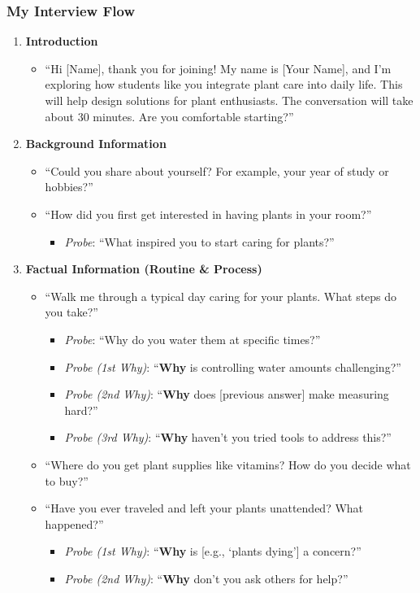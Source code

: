 \documentclass[math,code]{amznotes}
\theoremstyle{remark}
\begin{document}
\subsubsection{My Interview Flow}
\begin{enumerate}
    \item \textbf{Introduction}
    \begin{itemize}
        \item ``Hi [Name], thank you for joining! My name is [Your Name], and I’m exploring how students like you integrate plant care into daily life. This will help design solutions for plant enthusiasts. The conversation will take about 30 minutes. Are you comfortable starting?''
    \end{itemize}
    
    \item \textbf{Background Information}
    \begin{itemize}
        \item ``Could you share about yourself? For example, your year of study or hobbies?''
        \item ``How did you first get interested in having plants in your room?''
        \begin{itemize}
            \item \textit{Probe}: ``What inspired you to start caring for plants?''
        \end{itemize}
    \end{itemize}
    
    \item \textbf{Factual Information (Routine \& Process)}
    \begin{itemize}
        \item ``Walk me through a typical day caring for your plants. What steps do you take?''
        \begin{itemize}
            \item \textit{Probe}: ``Why do you water them at specific times?''
            \item \textit{Probe (1st Why)}: ``\textbf{Why} is controlling water amounts challenging?''
            \item \textit{Probe (2nd Why)}: ``\textbf{Why} does [previous answer] make measuring hard?''
            \item \textit{Probe (3rd Why)}: ``\textbf{Why} haven’t you tried tools to address this?''
        \end{itemize}
        \item ``Where do you get plant supplies like vitamins? How do you decide what to buy?''
        \item ``Have you ever traveled and left your plants unattended? What happened?''
        \begin{itemize}
            \item \textit{Probe (1st Why)}: ``\textbf{Why} is [e.g., ‘plants dying’] a concern?''
            \item \textit{Probe (2nd Why)}: ``\textbf{Why} don’t you ask others for help?''
        \end{itemize}
    \end{itemize}
    

\end{enumerate}
\end{document}
